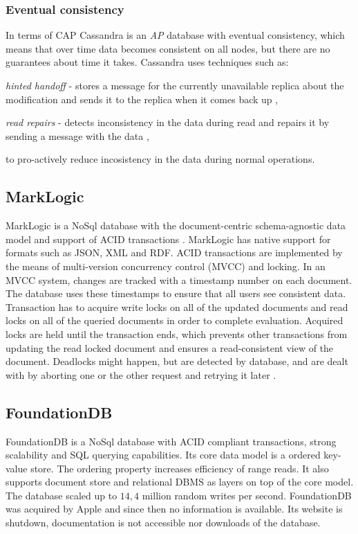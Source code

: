 \subsubsection{Eventual consistency}\label{sec:theory:eventualConsistency}
In terms of CAP \cite{brewer2000towards} \cite{Brewer:2012ba} Cassandra is an \emph{AP} database with eventual consistency, which means that over time data becomes consistent on all nodes, but there are no guarantees about time it takes. Cassandra uses techniques such as: \begin{enumerate*} 
\item \emph{hinted handoff} - stores a message for the currently unavailable replica about the modification and sends it to the replica when it comes back up \cite{CassandraHintedHandoff},  
\item \emph{read repairs} - detects inconsistency in the data during read and repairs it by sending a message with the data \cite{CassandraReadRepair},  \end{enumerate*} to pro-actively reduce incosistency in the data during normal operations.

\subsection{MarkLogic}
MarkLogic is a NoSql database with the document-centric schema-agnostic data model \cite{markLogicDataModel} and support of ACID transactions \cite{markLogicAcid}.
MarkLogic has native support for formats such as JSON, XML and RDF. ACID transactions are implemented by the means of multi-version concurrency control (MVCC) and locking. In an MVCC system, changes are tracked with a timestamp number on each document. 
The database uses these timestamps to ensure that all users see consistent data. 
Transaction has to acquire write locks on all of the updated documents and read locks on all of the queried documents in order to complete evaluation. Acquired locks are held until the transaction ends, which prevents other transactions from updating the read locked document and ensures a read-consistent view of the document. 
Deadlocks might happen, but are detected by database, and are dealt with by aborting one or the other request and retrying it later \cite{markLogicUnderstandingTransactions}.


\subsection{FoundationDB}
FoundationDB is a NoSql database with ACID compliant transactions, strong scalability and SQL querying capabilities.
Its core data model is a ordered key-value store. The ordering property increases efficiency of range reads. It also supports document store and relational DBMS as layers on top of the core model.  The database scaled up to $14,4$ million random writes per second. FoundationDB was acquired by Apple \cite{foundationDbAcquired} and since then no information is available. Its website is shutdown, documentation is not accessible nor downloads of the database.

